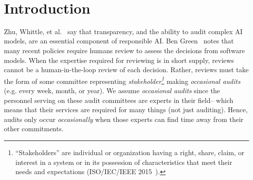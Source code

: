 \thispagestyle{empty}
 \begin{center}
{\bf \TITLE}\\
{
}
 \end{center}
\vspace{-3mm}
\noindent

\section{Introduction}  Zhu, Whittle, et al.~\cite{Zhu2022} say that transparency, and the ability to audit complex AI models, are an essential component of 
responsible AI. 
Ben Green~\cite{green2022flaws} notes that many recent policies      require humans review   to assess the decisions from software models.  
When the expertise required for   reviewing is in short supply,     reviews cannot be a human-in-the-loop review of each decision. Rather,   reviews must take the form of some committee
representing {\em stakeholder\footnote{``Stakeholders'' 
are individual or organization having a right, share, claim, or interest in a system or in its possession of characteristics that meet their needs and expectations (ISO/IEC/IEEE 2015~\cite{iso2015systems}).}}
making
{\em occasional audits} (e.g. every week, month, or year). We assume   {\em occasional audits}
since  the  personnel    serving on these audit committees are experts in their field-- which means
that their services are required for  many things  (not just auditing). Hence, 
 audits only occur {\em occasionally}  when those experts can find time
away from their other commitments. 

